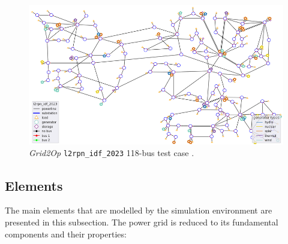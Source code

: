 \begin{figure}[H]
	\centering
	\includegraphics[width=0.85\linewidth]{./figures/grid2op-graph.png}
	\caption{\textit{Grid2Op} \texttt{l2rpn\_idf\_2023} 118-bus test case \cite{rtefranceGrid2OpDocumentation}.}
	\label{fig:grid2op-graph}
\end{figure}


\subsection{Elements}

The main elements that are modelled by the simulation environment are presented in this subsection. The power grid is reduced to its fundamental components and their properties:

